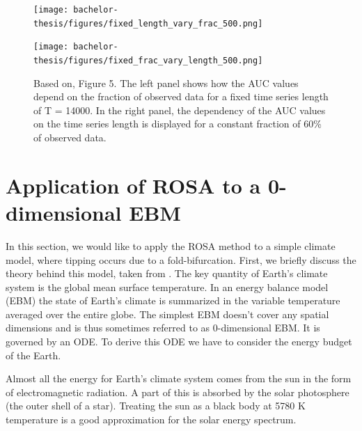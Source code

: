 \documentclass[%
thesis=student,%
coverpage=false,%
titlepage=false,%
headmarks=true, %
english,%
font=libertine, %
math=newpxtx, %
BCOR=5mm,%
coverBCOR=11mm%
]{tumbook}
\begin{document}
\begin{figure}[h!]
    \centering
    \begin{minipage}[t]{0.45\textwidth}
        \centering
        \texttt{[image: bachelor-thesis/figures/fixed\_length\_vary\_frac\_500.png]}
    \end{minipage}
    \hfill
    \begin{minipage}[t]{0.45\textwidth}
        \centering
        \texttt{[image: bachelor-thesis/figures/fixed\_frac\_vary\_length\_500.png]}
    \end{minipage}
    \vspace{0.5cm}
    
    \centering
    \begin{minipage}[b]{0.9\textwidth}
        \centering
    \end{minipage}
    \caption{Based on\cite{Morr:2024}, Figure 5. The left panel shows how the AUC values depend on the fraction of observed data for a fixed time series length of T = 14000. In the right panel, the dependency of the AUC values on the time series length is displayed for a constant fraction of 60\% of observed data. }
    \label{fig:time_length_and_fraction_of_observed_data_dependence}
\end{figure}


\chapter{Application of ROSA to a 0-dimensional EBM}

In this section, we would like to apply the ROSA method to a simple climate model, where tipping occurs due to a fold-bifurcation. First, we briefly discuss the theory behind this model, taken from \cite{Kaper:2013}. The key quantity of Earth's climate system is the global mean surface temperature. In an energy balance model (EBM) the state of Earth's climate is summarized in the variable temperature averaged over the entire globe. The simplest EBM doesn't cover any spatial dimensions and is thus sometimes referred to as 0-dimensional EBM. It is governed by an ODE. To derive this ODE we have to consider the energy budget of the Earth.

Almost all the energy for Earth's climate system comes from the sun in the form of electromagnetic radiation. A part of this is absorbed by the solar photosphere (the outer shell of a star). Treating the sun as a black body at 5780 K temperature is a good approximation for the solar energy spectrum.
\end{document}

